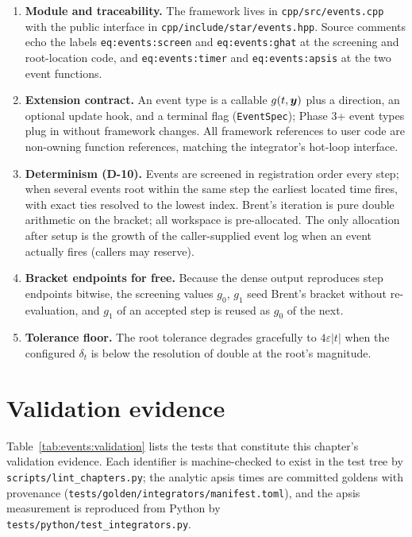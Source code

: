 \begin{enumerate}
  \item \textbf{Module and traceability.} The framework lives in
    \texttt{cpp/src/events.cpp} with the public interface in
    \texttt{cpp/include/star/events.hpp}. Source comments echo the labels
    \texttt{eq:events:screen} and \texttt{eq:events:ghat} at the screening
    and root-location code, and \texttt{eq:events:timer} and
    \texttt{eq:events:apsis} at the two event functions.
  \item \textbf{Extension contract.} An event type is a callable
    $g(t, \bm{y})$ plus a direction, an optional update hook, and a
    terminal flag (\texttt{EventSpec}); Phase 3+ event types plug in
    without framework changes. All framework references to user code are
    non-owning function references, matching the integrator's hot-loop
    interface.
  \item \textbf{Determinism (D-10).} Events are screened in registration
    order every step; when several events root within the same step the
    earliest located time fires, with exact ties resolved to the lowest
    index. Brent's iteration is pure double arithmetic on the bracket; all
    workspace is pre-allocated. The only allocation after setup is the
    growth of the caller-supplied event log when an event actually fires
    (callers may reserve).
  \item \textbf{Bracket endpoints for free.} Because the dense output
    reproduces step endpoints bitwise, the screening values $g_0$, $g_1$
    seed Brent's bracket without re-evaluation, and $g_1$ of an accepted
    step is reused as $g_0$ of the next.
  \item \textbf{Tolerance floor.} The root tolerance degrades gracefully to
    $4\varepsilon|t|$ when the configured $\delta_t$ is below the
    resolution of double at the root's magnitude.
\end{enumerate}

\section{Validation evidence}
\label{sec:events:validation}

Table~\ref{tab:events:validation} lists the tests that constitute this
chapter's validation evidence. Each identifier is machine-checked to exist
in the test tree by \texttt{scripts/lint\_chapters.py}; the analytic apsis
times are committed goldens with provenance
(\texttt{tests/golden/integrators/manifest.toml}), and the apsis
measurement is reproduced from Python by
\texttt{tests/python/test\_integrators.py}.

